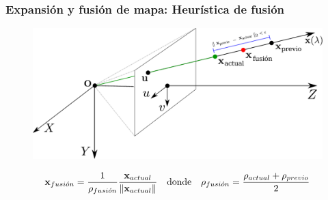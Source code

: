 \documentclass[compress]{beamer}
\begin{document}
\begin{frame}
	\frametitle{Expansión y fusión de mapa: Heurística de fusión}
	\begin{figure}[htb]
		\centering
		\includegraphics[width=\columnwidth]{method/metodo-fusion-spa.pdf}
	\end{figure}
	\begin{equation*}
		\boldsymbol{\mathbf{x}}_{fusi\acute{o}n}=\frac{1}{\rho_{fusi\acute{o}n}}\frac{\boldsymbol{\mathbf{x}}_{actual}}{\left\lVert\boldsymbol{\mathbf{x}}_{actual}\right\rVert}
		\quad \text{donde} \quad 
		\rho_{fusi\acute{o}n}=\frac{\rho_{actual}+\rho_{previo}}{2}
	\end{equation*}
\end{frame}
\end{document}

